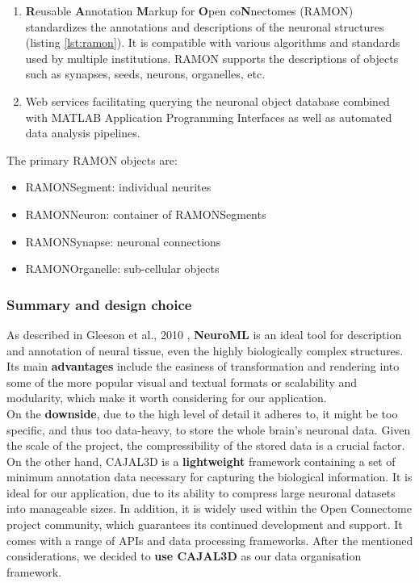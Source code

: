 \documentclass[a4paper, 11pt]{article}
\numberwithin{equation}{section}
\begin{document}
		\begin{enumerate}
			\item \textbf{R}eusable \textbf{A}nnotation \textbf{M}arkup for \textbf{O}pen co\textbf{N}nectomes (RAMON) standardizes the annotations and descriptions of the neuronal structures (listing \ref{lst:ramon}). It is compatible with various algorithms and standards used by multiple institutions.
			RAMON supports the descriptions of objects such as synapses, seeds, neurons, organelles, etc. \cite{burns2013open}
			
			\item Web services facilitating querying the neuronal object database combined with MATLAB Application Programming Interfaces as well as automated data analysis pipelines.
		\end{enumerate}
		
		\noindent The primary RAMON objects \cite{kasthuri2015github} are:
		\begin{itemize}
			\item RAMONSegment: individual neurites
			\item RAMONNeuron: container of RAMONSegments
			\item RAMONSynapse: neuronal connections
			\item RAMONOrganelle: sub-cellular objects
		\end{itemize}
		
		\subsubsection{Summary and design choice}
		
		\noindent As described in Gleeson et al., 2010 \cite{gleeson2010neuroml}, \textbf{NeuroML} is an ideal tool for description and annotation of neural tissue, even the highly biologically complex structures. Its main \textbf{advantages} include the easiness of transformation and rendering into some of the more popular visual and textual formats or scalability and modularity, which make it worth considering for our application. \\
		On the \textbf{downside}, due to the high level of detail it adheres to, it might be too specific, and thus too data-heavy, to store the whole brain's neuronal data. Given the scale of the project, the compressibility of the stored data is a crucial factor. \\
		
		\noindent On the other hand, CAJAL3D is a \textbf{lightweight} framework containing a set of minimum
		annotation data necessary for capturing the biological information. It is ideal for our application, due to its ability to compress large neuronal datasets into manageable sizes. In addition, it is widely used within the Open Connectome project community, which guarantees its continued development and support. It comes with a range of APIs and data processing frameworks. After the mentioned considerations, we decided to \textbf{use CAJAL3D} as our data organisation framework.
		
\end{document}
